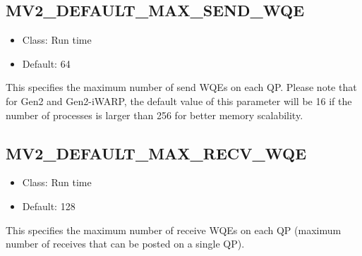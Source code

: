 % 
% 
% 

\subsection{MV2\_DEFAULT\_MAX\_SEND\_WQE}
\label{def:nem-max-send-wqe}

\begin{itemize}
        \item Class: Run time
        \item Default: 64
\end{itemize}

This specifies the maximum number of send WQEs on each QP. 
Please note that for Gen2 and Gen2-iWARP, the default value of this parameter
will be 16 if the number of processes is larger than 256 for better
memory scalability.

\subsection{MV2\_DEFAULT\_MAX\_RECV\_WQE}
\label{def:nem-max-recv-wqe}

\begin{itemize}
        \item Class: Run time
        \item Default: 128
\end{itemize}

This specifies the maximum number of receive WQEs on each QP (maximum
number of receives that can be posted on a single QP). 

